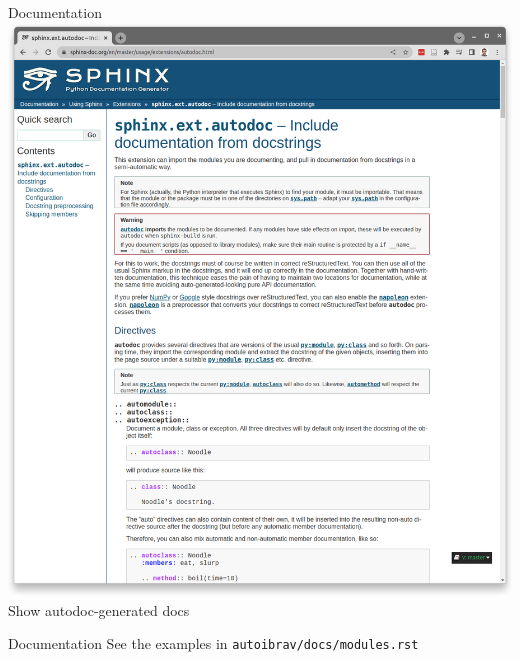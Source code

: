 \documentclass[xcolor=table,aspectratio=169]{beamer}
\numberwithin{equation}{section}
\begin{document}
\begin{frame}{Documentation}
  \includegraphics[width=\textwidth]{figures/autodoc.png}
  Show autodoc-generated docs
\end{frame}

\begin{frame}{Documentation}
  See the examples in \texttt{autoibrav/docs/modules.rst}
\end{frame}
\end{document}
